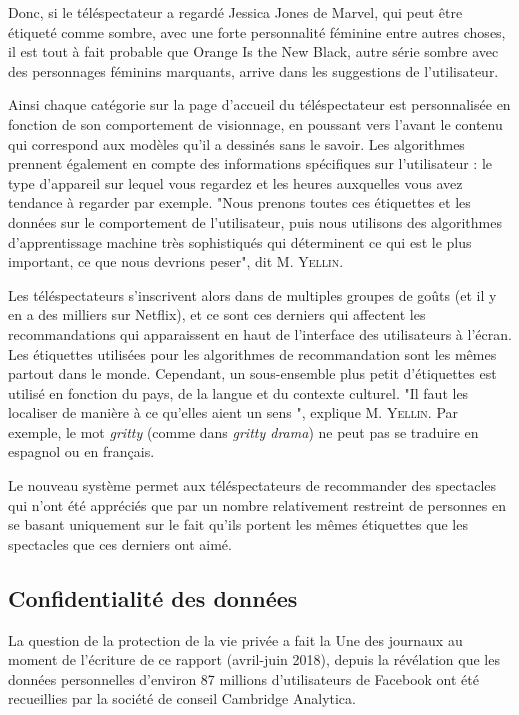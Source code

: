 \documentclass[a4paper,14pt]{extreport}
\begin{document}
Donc, si le téléspectateur a regardé Jessica Jones de Marvel, qui peut être étiqueté comme sombre, avec une forte personnalité féminine entre autres choses, il est tout à fait probable que Orange Is the New Black, autre série sombre avec des personnages féminins marquants, arrive dans les suggestions de l'utilisateur.

Ainsi chaque catégorie sur la page d'accueil du téléspectateur est personnalisée en fonction de son comportement de visionnage, en poussant vers l'avant le contenu qui correspond aux modèles qu’il a dessinés sans le savoir. Les algorithmes prennent également en compte des informations spécifiques sur l'utilisateur : le type d'appareil sur lequel vous regardez et les heures auxquelles vous avez tendance à regarder par exemple. "Nous prenons toutes ces étiquettes et les données sur le comportement de l'utilisateur, puis nous utilisons des algorithmes d'apprentissage machine très sophistiqués qui déterminent ce qui est le plus important, ce que nous devrions peser", dit M. \textsc{Yellin}.

Les téléspectateurs s'inscrivent alors dans de multiples groupes de goûts (et il y en a des milliers sur Netflix), et ce sont ces derniers qui affectent les recommandations qui apparaissent en haut de l’interface des utilisateurs à l'écran. Les étiquettes utilisées pour les algorithmes de recommandation sont les mêmes partout dans le monde. Cependant, un sous-ensemble plus petit d'étiquettes est utilisé en fonction du pays, de la langue et du contexte culturel. "Il faut les localiser de manière à ce qu'elles aient un sens ", explique M. \textsc{Yellin}. Par exemple, le mot \textit{gritty} (comme dans \textit{gritty drama}) ne peut pas se traduire en espagnol ou en français.

Le nouveau système permet aux téléspectateurs de recommander des spectacles qui n'ont été appréciés que par un nombre relativement restreint de personnes en se basant uniquement sur le fait qu'ils portent les mêmes étiquettes que les spectacles que ces derniers ont aimé.

\subsection{Confidentialité des données}

La question de la protection de la vie privée a fait la Une des journaux au moment de l'écriture de ce rapport (avril-juin 2018), depuis la révélation que les données personnelles d'environ 87 millions d'utilisateurs de Facebook ont été recueillies par la société de conseil Cambridge Analytica.
\end{document}
